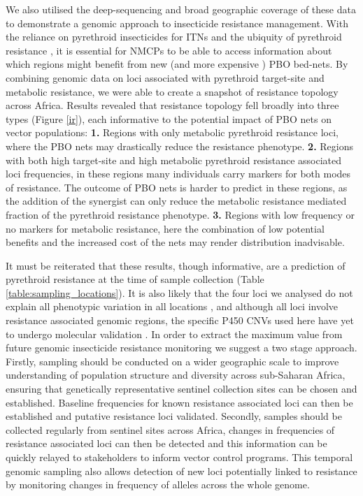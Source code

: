 \documentclass[a4paper,11pt,abstracton,hidelinks]{scrartcl}
\begin{document}
We also utilised the deep-sequencing and broad geographic coverage of these data to demonstrate a genomic approach to insecticide resistance management.
%
With the reliance on pyrethroid insecticides for ITNs and the ubiquity of pyrethroid resistance \cite{Hemingway2016}, it is essential for NMCPs to be able to access information about which regions might benefit from new (and more expensive \cite{churcher2016}) PBO bed-nets.
By combining genomic data on loci associated with pyrethroid target-site and metabolic resistance, we were able to create a snapshot of resistance topology across Africa.
%
Results revealed that resistance topology fell broadly into three types (Figure \ref{ir}), each informative to the potential impact of PBO nets on vector populations:
\textbf{1.} Regions with only metabolic pyrethroid resistance loci, where the PBO nets may drastically reduce the resistance phenotype.
%
\textbf{2.} Regions with both high target-site and high metabolic pyrethroid resistance associated loci frequencies, in these regions many individuals carry markers for both modes of resistance.
The outcome of PBO nets is harder to predict in these regions, as the addition of the synergist can only reduce the metabolic resistance mediated fraction of the pyrethroid resistance phenotype.
%
\textbf{3.} Regions with low frequency or no markers for metabolic resistance, here the combination of low potential benefits and the increased cost of the nets may render distribution inadvisable.

It must be reiterated that these results, though informative, are a prediction of pyrethroid resistance at the time of sample collection (Table \ref{table:sampling_locations}).
%
It is also likely that the four loci we analysed do not explain all phenotypic variation in all locations \cite{donnelly2016, mitchell2014}, and although all loci involve resistance associated genomic regions, the specific P450 CNVs used here have yet to undergo molecular validation \cite{lucas2019}.
In order to extract the maximum value from future genomic insecticide resistance monitoring we suggest a two stage approach.
%
Firstly, sampling should be conducted on a wider geographic scale to improve understanding of population structure and diversity across sub-Saharan Africa, ensuring that genetically representative sentinel collection sites can be chosen and established.
%
Baseline frequencies for known resistance associated loci can then be established and putative resistance loci validated.
%
Secondly, samples should be collected regularly from sentinel sites across Africa, changes in frequencies of resistance associated loci can then be detected and this information can be quickly relayed to stakeholders to inform vector control programs.
%
This temporal genomic sampling also allows detection of new loci potentially linked to resistance by monitoring changes in frequency of alleles across the whole genome.
\end{document}
